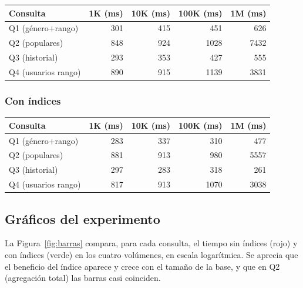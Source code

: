 \documentclass[12pt,a4paper]{article}
\begin{document}
\begin{center}
\begin{tabular}{lrrrr}
\toprule
\textbf{Consulta} & \textbf{1K (ms)} & \textbf{10K (ms)}
  & \textbf{100K (ms)} & \textbf{1M (ms)} \\
\midrule
Q1 (género+rango)   &  301 &  415 &  451 &  626 \\
Q2 (populares)      &  848 &  924 & 1028 & 7432 \\
Q3 (historial)      &  293 &  353 &  427 &  555 \\
Q4 (usuarios rango) &  890 &  915 & 1139 & 3831 \\
\bottomrule
\end{tabular}
\end{center}

\subsubsection{Con índices}

\begin{center}
\begin{tabular}{lrrrr}
\toprule
\textbf{Consulta} & \textbf{1K (ms)} & \textbf{10K (ms)}
  & \textbf{100K (ms)} & \textbf{1M (ms)} \\
\midrule
Q1 (género+rango)   &  283 &  337 &  310 &  477 \\
Q2 (populares)      &  881 &  913 &  980 & 5557 \\
Q3 (historial)      &  297 &  283 &  318 &  261 \\
Q4 (usuarios rango) &  817 &  913 & 1070 & 3038 \\
\bottomrule
\end{tabular}
\end{center}


\subsection{Gráficos del experimento}

La Figura~\ref{fig:barras} compara, para cada consulta, el tiempo sin índices
(rojo) y con índices (verde) en los cuatro volúmenes, en escala logarítmica. Se
aprecia que el beneficio del índice aparece y crece con el tamaño de la base, y
que en Q2 (agregación total) las barras casi coinciden.
\end{document}
